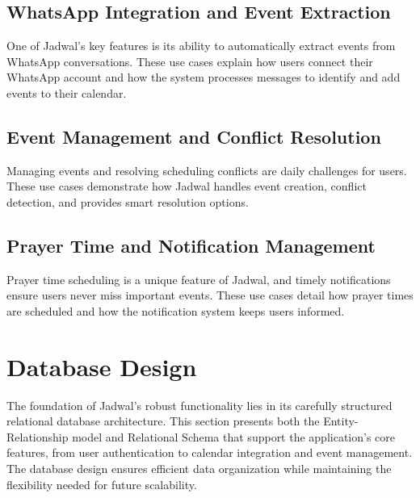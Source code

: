 \documentclass[12pt,a4paper,twoside]{report}
\begin{document}
\subsection{WhatsApp Integration and Event Extraction}
One of Jadwal's key features is its ability to automatically extract events from WhatsApp conversations. These use cases explain how users connect their WhatsApp account and how the system processes messages to identify and add events to their calendar.




\subsection{Event Management and Conflict Resolution}
Managing events and resolving scheduling conflicts are daily challenges for users. These use cases demonstrate how Jadwal handles event creation, conflict detection, and provides smart resolution options.





\subsection{Prayer Time and Notification Management}
Prayer time scheduling is a unique feature of Jadwal, and timely notifications ensure users never miss important events. These use cases detail how prayer times are scheduled and how the notification system keeps users informed.









\section{Database Design}

The foundation of Jadwal's robust functionality lies in its carefully structured relational database architecture. This section presents both the Entity-Relationship model and Relational Schema that support the application's core features, from user authentication to calendar integration and event management. The database design ensures efficient data organization while maintaining the flexibility needed for future scalability.
\end{document}
